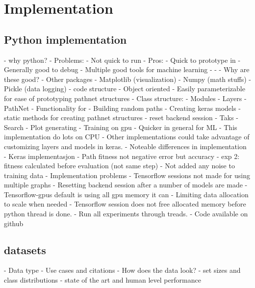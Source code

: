 \chapter{Implementation}
\section{Python implementation}
- why python? 
    - Problems: 
        - Not quick to run 
    - Pros: 
        - Quick to prototype in 
        - Generally good to debug
        - Multiple good tools for machine learning
            - \cite{tensorflow}
            - \cite{keras}
            - Why are these good?
        - Other packages
            - Matplotlib (visualization)
            - Numpy (math stuffs)
            - Pickle (data logging)
- code structure
    - Object oriented
        - Easily parameterizable for ease of prototyping pathnet structures
    - Class structure: 
        - Modules
        - Layers
        - PathNet
            - Functionality for
                - Building random paths
                - Creating keras models
                - static methods for creating pathnet structures
                - reset backend session
        - Taks
        - Search
        - Plot generating
- Training on gpu
    - Quicker in general for ML
    - This implementation do lots on CPU
        - Other implementations could take advantage of customizing layers and models in keras. 
- Noteable differences in implementation 
    - Keras implementasjon
    - Path fitness not negative error but accuracy
    - exp 2: fitness calculated before evaluation (not same step)
    - Not added any noise to training data
- Implementation problems
    - Tensorflow sessions not made for using multiple graphs
        - Resetting backend session after a number of models are made
    - Tensorflow-gpus default is using all gpu memory it can 
        - Limiting data allocation to scale when needed
    - Tensorflow session does not free allocated memory before python thread is done. 
        - Run all experiments through treads. 
- Code available on github

\section{datasets}
- Data type
- Use cases and citations
- How does the data look?
- set sizes and class distributions
- state of the art and human level performance
\cite{MNIST}
\cite{SVHN}

